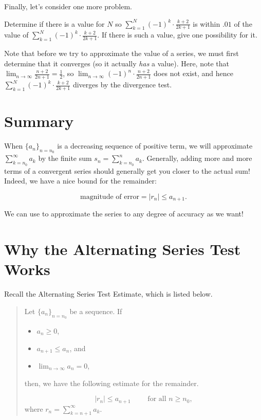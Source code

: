 \documentclass{ximera}
\begin{document}
Finally, let's consider one more problem.
\begin{question}
Determine if there is a value for $N$ so $\sum_{k=1}^{N} (-1)^k \cdot \frac{k+2}{2k+1}$ is within $.01$ of the value of $\sum_{k=1}^{N} (-1)^k \cdot \frac{k+2}{2k+1}$.  If there is such a value, give one possibility for it.

\begin{multipleChoice}
\end{multipleChoice}

\begin{feedback}
Note that before we try to approximate the value of a series, we must first determine that it converges (so it actually \emph{has} a value).  Here, note that $\lim_{n \to \infty} \frac{n+2}{2n+1} = \frac{1}{2}$, so $\lim_{n \to \infty} (-1)^n \cdot \frac{n+2}{2n+1}$ does not exist, and hence $\sum_{k=1}^{N} (-1)^k \cdot \frac{k+2}{2k+1}$ diverges by the divergence test.
\end{feedback}
\end{question}

\section{Summary}

When $\{a_n\}_{n = n_0}$ is a decreasing sequence of positive term, we will approximate $\sum_{k=n_0}^{\infty} a_k$ by the finite sum $s_n =\sum_{k=n_0}^{n} a_k$.  Generally, adding more and more terms of a convergent series should generally get you closer to the actual sum!
Indeed, we have a nice bound for the remainder:

\[ \textrm{magnitude of error} = |r_n| \leq a_{n+1}.\]  

We can use to approximate the series to any degree of accuracy as we want!





\section{Why the Alternating Series Test Works}

Recall the Alternating Series Test Estimate, which is listed below.

\begin{quote}
Let $\{a_n\}_{n=n_0}$ be a sequence.  If

\begin{itemize}
\item $a_n \geq 0$,
\item $a_{n+1} \leq a_n$, and
\item $\lim_{n \to\infty} a_n=0$, 
\end{itemize}

then, we have the following estimate for the remainder.

\[
\big| r_n \big| \leq a_{n+1} \qquad \textrm{ for all } n \geq n_0,
\]
where $r_n = \sum_{k=n+1}^{\infty} a_k$.
\end{quote}
\end{document}
